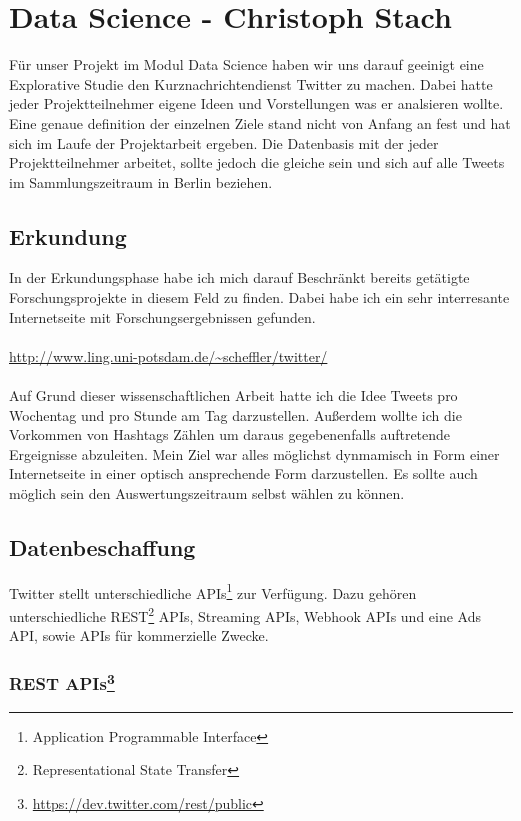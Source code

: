 



\chapter{Data Science - Christoph Stach}

Für unser Projekt im Modul Data Science haben wir uns darauf geeinigt eine Explorative Studie den Kurznachrichtendienst Twitter zu machen.
Dabei hatte jeder Projektteilnehmer eigene Ideen und Vorstellungen was er analsieren wollte.
Eine genaue definition der einzelnen Ziele stand nicht von Anfang an fest und hat sich im Laufe der Projektarbeit ergeben.
Die Datenbasis mit der jeder Projektteilnehmer arbeitet, sollte jedoch die gleiche sein und sich auf alle Tweets im Sammlungszeitraum in Berlin beziehen.

\section{Erkundung}

In der Erkundungsphase habe ich mich darauf Beschränkt bereits getätigte Forschungsprojekte in diesem Feld zu finden.
Dabei habe ich ein sehr interresante Internetseite mit Forschungsergebnissen gefunden.
\\
\\
\url{http://www.ling.uni-potsdam.de/~scheffler/twitter/}
\\
\\
Auf Grund dieser wissenschaftlichen Arbeit hatte ich die Idee Tweets pro Wochentag und pro Stunde am Tag darzustellen.
Außerdem wollte ich die Vorkommen von Hashtags Zählen um daraus gegebenenfalls auftretende Ergeignisse abzuleiten.
Mein Ziel war alles möglichst dynmamisch in Form einer Internetseite in einer optisch ansprechende Form darzustellen.
Es sollte auch möglich sein den Auswertungszeitraum selbst wählen zu können.

\section{Datenbeschaffung}

Twitter stellt unterschiedliche APIs\footnote{Application Programmable Interface} zur Verfügung. 
Dazu gehören unterschiedliche REST\footnote{Representational State Transfer} APIs, Streaming APIs, Webhook APIs und eine Ads API, sowie APIs für kommerzielle Zwecke.
\\
\subsection{REST APIs\footnote{\url{https://dev.twitter.com/rest/public}}}

